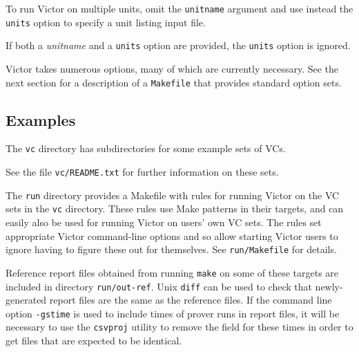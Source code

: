 \documentclass[12pt,fleqn]{article}
\newcommand{\spark}{\textsc{Spark}}
\begin{document}
To run Victor on multiple units, omit the \texttt{unitname} argument
and use instead the \texttt{units} option to specify a unit listing
input file.

If both a \textit{unitname} and a \texttt{units} option are provided,
the \texttt{units} option is ignored.

Victor takes numerous options, many of which are currently necessary.
See the next section for a description of a \texttt{Makefile} that
provides standard option sets.


\subsection{Examples}
\label{sec:examples}

The \texttt{vc} directory has subdirectories for some example 
sets of VCs.

See the file \texttt{vc/README.txt} for further information on these sets.

The \texttt{run} directory provides a Makefile with rules for
running Victor on the VC sets in the \texttt{vc} directory.
%
These rules use Make patterns in their targets, and can easily also be
used for running Victor on users' own VC sets.
%
The rules set appropriate Victor command-line options and so allow
starting Victor users to ignore having to figure these out for
themselves.
%
See \texttt{run/Makefile} for details.

Reference report files obtained from running \texttt{make} on some of
these targets are included in directory \texttt{run/out-ref}.
%
Unix \texttt{diff} can be used to check that newly-generated
report files are the same as the reference files.
%
If the command line option \texttt{-gstime} is used to include times
of prover runs in report files, it will be necessary to use
the \texttt{csvproj} utility to remove the field for these times
in order to get files that are expected to be identical.
\end{document}
